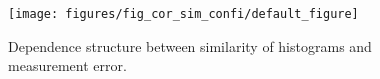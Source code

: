 \begin{figure}[h!]
\begin{center}
\texttt{[image: figures/fig\_cor\_sim\_confi/default\_figure]}
\caption{{\label{fig:cor_sim_confi} Dependence structure between similarity of histograms and
    measurement error.%
}}
\end{center}
\end{figure}

